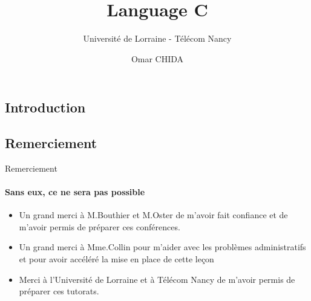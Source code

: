 \documentclass{beamer}
\title{Language C}
\subtitle{Université de Lorraine - Télécom Nancy}
\author{Omar CHIDA}
\begin{document}
  \frame[c]{\maketitle}


  \begin{darkframes}
  	\section{Introduction}
  	
  	\subsection{Remerciement}
  	\begin{frame}{Remerciement}
  		\framesubtitle{Sans eux, ce ne sera pas possible}
  		\begin{itemize}
  			\item Un grand merci à M.Bouthier et M.Oster de m'avoir fait confiance et de m'avoir permis de préparer ces conférences.
  			\item Un grand merci à Mme.Collin pour m'aider avec les problèmes administratifs et pour avoir accéléré la mise en place de cette leçon
  			\item Merci à l'Université de Lorraine et à Télécom Nancy de m'avoir permis de préparer ces tutorats.
  		\end{itemize}
  	\end{frame}
  	

\end{darkframes}
\end{document}
